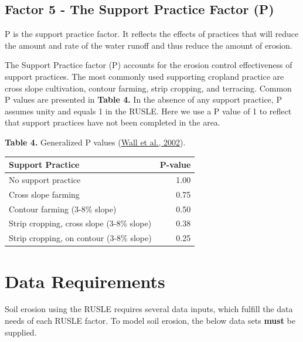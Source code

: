 \documentclass[
]{article}
\begin{document}
\hypertarget{sec-factor-5}{%
\subsection*{Factor 5 - The Support Practice Factor (P)}\label{sec-factor-5}}

P is the support practice factor. It reflects the effects of practices that will reduce the amount and rate of the water runoff and thus reduce the amount of erosion.

The Support Practice factor (P) accounts for the erosion control effectiveness of support practices. The most commonly used supporting cropland practice are cross slope cultivation, contour farming, strip cropping, and terracing. Common P values are presented in \textbf{Table 4.} In the absence of any support practice, P assumes unity and equals 1 in the RUSLE. Here we use a P value of 1 to reflect that support practices have not been completed in the area.

\textbf{Table 4.} Generalized P values (\href{https://sis.agr.gc.ca/cansis/publications/manuals/2002-92/rusle-can.pdf}{Wall et al., 2002}).

\begin{table}
\centering
\begin{tabular}[t]{l|r}
\hline
Support Practice & P-value\\
\hline
No support practice & 1.00\\
\hline
Cross slope farming & 0.75\\
\hline
Contour farming (3-8\% slope) & 0.50\\
\hline
Strip cropping, cross slope (3-8\% slope) & 0.38\\
\hline
Strip cropping, on contour (3-8\% slope) & 0.25\\
\hline
\end{tabular}
\end{table}

\hypertarget{sec-Data-Requirements}{%
\section*{Data Requirements}\label{sec-Data-Requirements}}

Soil erosion using the RUSLE requires several data inputs, which fulfill the data needs of each RUSLE factor. To model soil erosion, the below data sets \textbf{must} be supplied.
\end{document}

